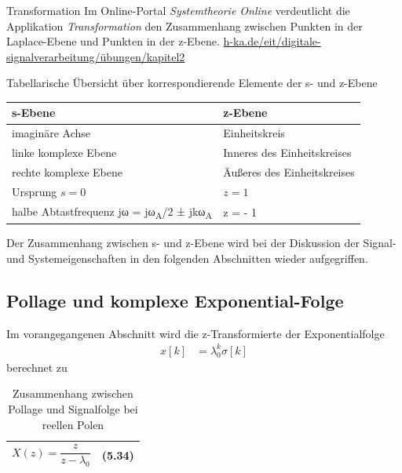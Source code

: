 \begin{application}{Transformation}
  Im Online-Portal \emph{Systemtheorie Online} verdeutlicht die Applikation \emph{Transformation} den Zusammenhang zwischen Punkten in der Laplace-Ebene und Punkten in der z-Ebene.
  \tcblower
  \url{h-ka.de/eit/digitale-signalverarbeitung/übungen/kapitel2}
\end{application}


\begin{summary}{Tabellarische Übersicht über korrespondierende Elemente der s- und z-Ebene}
\label{tab:5.1}
\begin{center}
  \begin{tabular}{ll}
    \toprule
    s-Ebene & z-Ebene \\
    \midrule
    imaginäre Achse & Einheitskreis \\
    linke komplexe Ebene & Inneres des Einheitskreises \\
    rechte komplexe Ebene & Äußeres des Einheitskreises \\
    Ursprung \(s = 0\) & \(z = 1\) \\
    halbe Abtastfrequenz jω = jω\textsubscript{A}/2 ± jkω\textsubscript{A} & z = - 1 \\
    \bottomrule
  \end{tabular}
\end{center}
\end{summary}

Der Zusammenhang zwischen s- und z-Ebene wird bei der Diskussion der Signal- und Systemeigenschaften in den folgenden Abschnitten wieder aufgegriffen.

\subsection{Pollage und komplexe Exponential-Folge}\label{sec:pollage-und-komplexe-exponential-folge}

Im vorangegangenen Abschnitt wird die z-Transformierte der Exponentialfolge
\begin{align}
x[ k] &= \lambda_{0}^{k}  \sigma[ k] \label{eq:5.33}
\end{align}
berechnet zu

\begin{table}
  \centering
  \caption{Zusammenhang zwischen Pollage und Signalfolge bei reellen Polen}
  \label{tab:5.2}
  \begin{tabular}{ll}
    \toprule
    \noalign{}

\[X(z) = \frac{z}{z - \lambda_{0}}\]
 & 
\protect{}\label{_Ref273456945}{}(5.34) \\
    \bottomrule
  \end{tabular}
\end{table}

